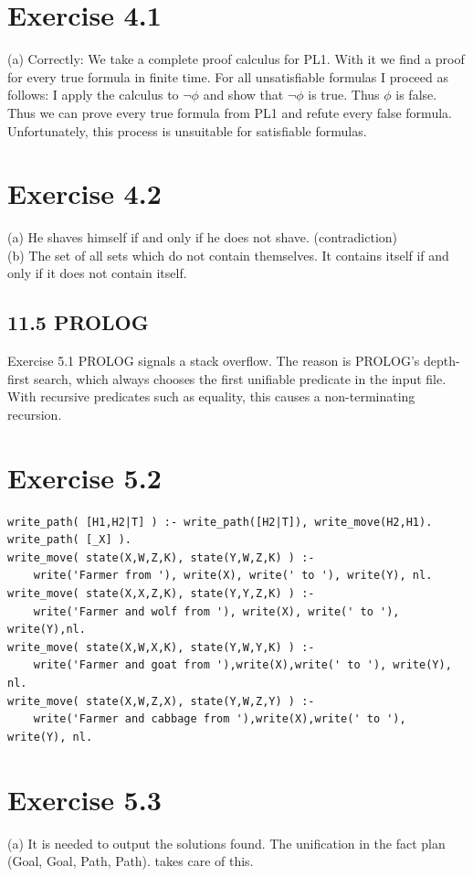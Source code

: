 \documentclass[10pt]{book}
\begin{document}
\begin{center}
\begin{enumerate}
\begin{center}
\begin{center}
\begin{center}
\begin{center}
\begin{center}
\section*{Exercise 4.1}
(a) Correctly: We take a complete proof calculus for PL1. With it we find a proof for every true formula in finite time. For all unsatisfiable formulas I proceed as follows: I apply the calculus to $\neg \phi$ and show that $\neg \phi$ is true. Thus $\phi$ is false. Thus we can prove every true formula from PL1 and refute every false formula. Unfortunately, this process is unsuitable for satisfiable formulas.

\section*{Exercise 4.2}
(a) He shaves himself if and only if he does not shave. (contradiction)\\
(b) The set of all sets which do not contain themselves. It contains itself if and only if it does not contain itself.

\subsection*{11.5 PROLOG}
Exercise 5.1 PROLOG signals a stack overflow. The reason is PROLOG's depth-first search, which always chooses the first unifiable predicate in the input file. With recursive predicates such as equality, this causes a non-terminating recursion.

\section*{Exercise 5.2}
\begin{verbatim}
write_path( [H1,H2|T] ) :- write_path([H2|T]), write_move(H2,H1).
write_path( [_X] ).
write_move( state(X,W,Z,K), state(Y,W,Z,K) ) :-
    write('Farmer from '), write(X), write(' to '), write(Y), nl.
write_move( state(X,X,Z,K), state(Y,Y,Z,K) ) :-
    write('Farmer and wolf from '), write(X), write(' to '), write(Y),nl.
write_move( state(X,W,X,K), state(Y,W,Y,K) ) :-
    write('Farmer and goat from '),write(X),write(' to '), write(Y), nl.
write_move( state(X,W,Z,X), state(Y,W,Z,Y) ) :-
    write('Farmer and cabbage from '),write(X),write(' to '), write(Y), nl.
\end{verbatim}

\section*{Exercise 5.3}
(a) It is needed to output the solutions found. The unification in the fact plan (Goal, Goal, Path, Path). takes care of this.\\


\end{center}
\end{center}
\end{center}
\end{center}
\end{center}
\end{enumerate}
\end{center}
\end{document}
